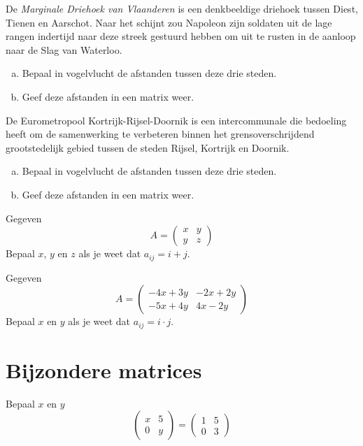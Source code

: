 \documentclass[12pt,twoside]{article}
\begin{document}
\begin{oefening}
De {\em Marginale Driehoek van Vlaanderen} is een denkbeeldige driehoek tussen Diest, Tienen en Aarschot. Naar het schijnt zou Napoleon zijn soldaten uit de lage rangen indertijd naar deze streek gestuurd hebben om uit te rusten in de aanloop naar de Slag van Waterloo.
\begin{enumerate}[(a)]
  \item Bepaal in vogelvlucht de afstanden tussen deze drie steden.
  \item Geef deze afstanden in een matrix weer.
\end{enumerate}
\end{oefening}

\begin{oefening}
De Eurometropool Kortrijk-Rijsel-Doornik is een intercommunale die bedoeling heeft om de samenwerking te verbeteren binnen het grensoverschrijdend grootstedelijk gebied tussen de steden Rijsel, Kortrijk en Doornik.
\begin{enumerate}[(a)]
  \item Bepaal in vogelvlucht de afstanden tussen deze drie steden.
  \item Geef deze afstanden in een matrix weer.
\end{enumerate}
\end{oefening}

\begin{oefening}
Gegeven
$$A=\begin{pmatrix}
  x & y\\
  y & z
\end{pmatrix}$$
Bepaal $x$, $y$ en $z$ als je weet dat $a_{ij}=i+j$.
\end{oefening}

\begin{oefening}
Gegeven
$$A=\begin{pmatrix}
  -4x+3y & -2x+2y\\
  -5x+4y & 4x-2y
\end{pmatrix}$$
Bepaal $x$ en $y$ als je weet dat $a_{ij}=i\cdot j$.
\end{oefening}


\pagebreak

\section{Bijzondere matrices}


\begin{oefening}
Bepaal $x$ en $y$
$$\begin{pmatrix}
  x & 5\\
  0 & y
\end{pmatrix}
=
\begin{pmatrix}
  1 & 5\\
  0 & 3
\end{pmatrix}$$
\end{oefening}
\end{document}
